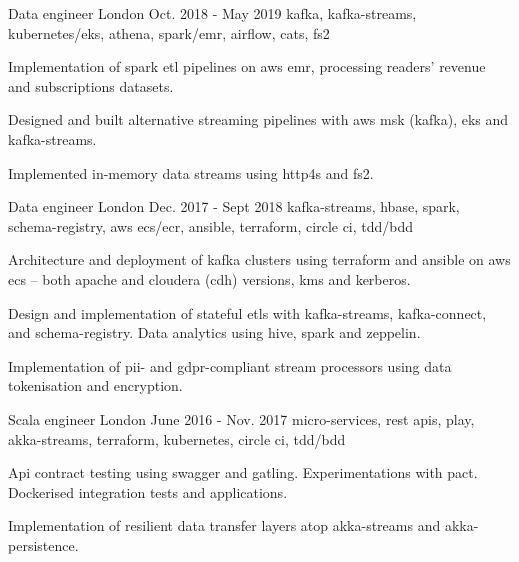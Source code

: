 \begin{cventries}
  \cventry
    {Data engineer} %
    {} %
    {London} %
    {Oct. 2018 - May 2019} %
    {kafka, kafka-streams, kubernetes/eks, athena, spark/emr, airflow, cats, fs2} %
    {
      \begin{cvitems} %
        \item {Implementation of spark etl pipelines on aws emr, processing readers' revenue and subscriptions datasets.}
        \item {Designed and built alternative streaming pipelines with aws msk (kafka), eks and kafka-streams.}
        \item {Implemented in-memory data streams using http4s and fs2.}
      \end{cvitems}
    }

  \cventry
    {Data engineer} %
    {} %
    {London} %
    {Dec. 2017 - Sept 2018} %
    {kafka-streams, hbase, spark, schema-registry, aws ecs/ecr, ansible, terraform, circle ci, tdd/bdd} %
    {
      \begin{cvitems} %
        \item {Architecture and deployment of kafka clusters using terraform and ansible on aws ecs -- both apache and cloudera (cdh) versions, kms and kerberos.}
        \item {Design and implementation of stateful etls with kafka-streams, kafka-connect, and schema-registry. Data analytics using hive, spark and zeppelin.}
        \item {Implementation of pii- and gdpr-compliant stream processors using data tokenisation and encryption.}
      \end{cvitems}
    }

  \cventry
    {Scala engineer} %
    {} %
    {London} %
    {June 2016 - Nov. 2017} %
    {micro-services, rest apis, play, akka-streams, terraform, kubernetes, circle ci, tdd/bdd} %
    {
      \begin{cvitems} %
        \item {Api contract testing using swagger and gatling. Experimentations with pact. Dockerised integration tests and applications.}
        \item {Implementation of resilient data transfer layers atop akka-streams and akka-persistence.}
      \end{cvitems}
    }


\end{cventries}
